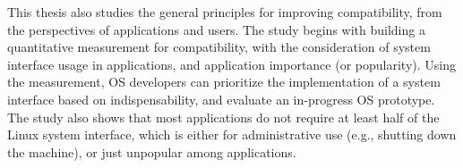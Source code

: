 





This thesis also studies the general principles
for improving compatibility, from the perspectives of applications and users.
The study begins with building a quantitative measurement
for compatibility, with the consideration of system interface usage in applications,
and application importance (or popularity).
Using the measurement,
OS developers can prioritize the implementation of a system interface based on indispensability,
and evaluate an in-progress OS prototype.
The study also shows that most applications do not require at least half of the Linux system interface,
which is either for administrative use (e.g., shutting down the machine), or just unpopular among applications.


